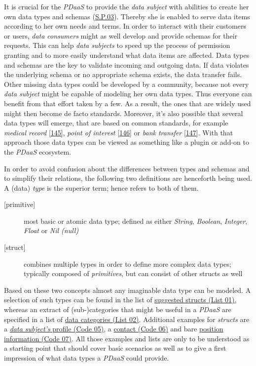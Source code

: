 \documentclass[12pt,english,a4paper,titlepage,cleardoublepage=empty,dottedtoc]{report}
\begin{document}
It is crucial for the \emph{PDaaS} to provide the \emph{data subject}
with abilities to create her own data types and schemas
(\protect\hyperlink{sp03}{S.P.03}). Thereby she is enabled to serve data
items according to her own needs and terms. In order to interact with
their customers or users, \emph{data consumers} might as well develop
and provide schemas for their requests. This can help \emph{data
subjects} to speed up the process of permission granting and to more
easily understand what data items are affected. Data types and schemas
are the key to validate incoming and outgoing data. If data violates the
underlying schema or no appropriate schema exists, the data transfer
fails. Other missing data types could be developed by a community,
because not every \emph{data subject} might be capable of modeling her
own data types. Thus everyone can benefit from that effort taken by a
few. As a result, the ones that are widely used might then become de
facto standards. Moreover, it's also possible that several data types
will emerge, that are based on common standards, for example
\emph{medical record}
{[}\protect\hyperlink{ref-web_spec_data-schemas_ehr}{145}{]},
\emph{point of interest}
{[}\protect\hyperlink{ref-web_spec_data-schemas_poi}{146}{]} or
\emph{bank transfer}
{[}\protect\hyperlink{ref-web_spec_data-schemas_bank-transfer}{147}{]}.
With that approach those data types can be viewed as something like a
plugin or add-on to the \emph{PDaaS} ecosystem.

In order to avoid confusion about the differences between types and
schemas and to simplify their relations, the following two definitions
are henceforth being used. A (data) \emph{type} is the superior term;
hence refers to both of them.

\begin{description}
\item[{[}primitive{]}]
most basic or atomic data type; defined as either \emph{String},
\emph{Boolean}, \emph{Integer}, \emph{Float} or \emph{Nil (null)}
\item[{[}struct{]}]
combines multiple types in order to define more complex data types;
typically composed of \emph{primitives}, but can consist of other
structs as well
\end{description}

Based on these two concepts almost any imaginable data type can be
modeled. A selection of such types can be found in the list of
\protect\hyperlink{list-01_suggested-structs}{suggested structs (List
01)}, whereas an extract of (sub-)categories that might be useful in a
\emph{PDaaS} are specified in a list of
\protect\hyperlink{list-02_data-categories}{data categories (List 02)}.
Additional examples for \emph{structs} are a
\protect\hyperlink{code-05_struct_profile}{\emph{data subject's} profile
(Code 05)}, a \protect\hyperlink{code-06_struct_contact}{contact (Code
06)} and bare \protect\hyperlink{code-07_struct_position}{position
information (Code 07)}. All those examples and lists are only to be
understood as a starting point that should cover basic scenarios as well
as to give a first impression of what data types a \emph{PDaaS} could
provide.
\end{document}
